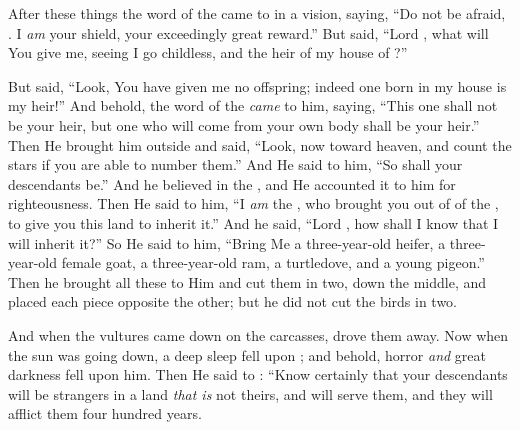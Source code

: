 
\bverse After these things the word of the \lord came to  in a vision, saying, ``Do not be afraid, . I \textit{am} your shield, your exceedingly great reward.''
\bverse But  said, ``Lord \god\unskip{}, what will You give me, seeing I go childless, and the heir of my house \is {} of ?''

\bverse But  said, ``Look, You have given me no offspring; indeed one born in my house is my heir!''
\bverse And behold, the word of the \lord \textit{came} to him, saying, ``This one shall not be your heir, but one who will come from your own body shall be your heir.'' 
\bverse Then He brought him outside and said, ``Look, now toward heaven, and count the stars if you are able to number them.'' And He said to him, ``So shall your descendants be.''
\bverse And he believed in the \lord, and He accounted it to him for righteousness.
\bverse Then He said to him, ``I \textit{am} the \lord, who brought you out of  of the , to give you this land to inherit it.''
\bverse And he said, ``Lord \god, how shall I know that I will inherit it?''
\bverse So He said to him, ``Bring Me a three-year-old heifer, a three-year-old female goat, a three-year-old ram, a turtledove, and a young pigeon.''
\bverse Then he brought all these to Him and cut them in two, down the middle, and placed each piece opposite the other; but he did not cut the birds in two.

\bverse And when the vultures came down on the carcasses,  drove them away.
\bverse Now when the sun was going down, a deep sleep fell upon ; and behold, horror \textit{and} great darkness fell upon him. 
\bverse Then He said to : ``Know certainly that your descendants will be strangers in a land \textit{that is} not theirs, and will serve them, and they will afflict them four hundred years.

